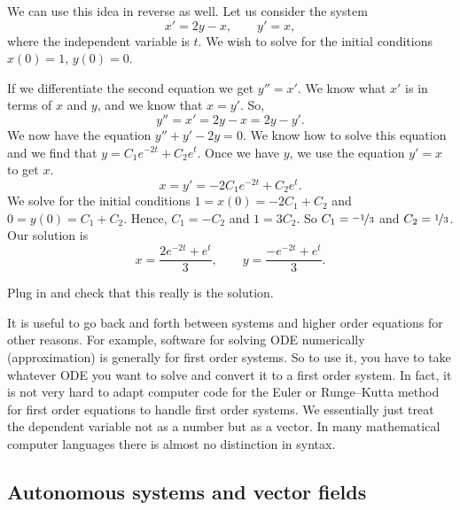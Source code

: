 \begin{example}
We can use this idea in reverse as well.  Let us consider 
the system
\begin{equation*}
x' = 2y-x , \qquad
y' = x, 
\end{equation*}
where the independent variable is $t$.  We wish to solve for the initial
conditions $x(0) = 1$, $y(0) =0$.

If we differentiate the second equation we get
$y''=x'$.  We know what $x'$ is in terms of $x$ and $y$, and
we know that $x=y'$.  So,
\begin{equation*}
y'' = x' = 2y-x = 2y-y' .
\end{equation*}
We now have the equation $y''+y'-2y = 0$.  We know how to solve this
equation and we find that $y = C_1 e^{-2t} + C_2 e^t$.  Once we have $y$,
we use the equation $y' = x$ to get $x$.
\begin{equation*}
x = y' = -2 C_1 e^{-2t} + C_2 e^t .
\end{equation*}
We solve for the initial conditions $1 = x(0) = -2 C_1 + C_2$
and $0 = y(0) = C_1 + C_2$.  Hence, $C_1 = -C_2$ and $1 = 3C_2$.
So $C_1 = \nicefrac{-1}{3}$ and $C_2 = \nicefrac{1}{3}$.  Our solution is
\begin{equation*}
x = \frac{2e^{-2t} + e^t}{3} ,\qquad
y = \frac{-e^{-2t} + e^t}{3} .
\end{equation*}
\end{example}

\begin{exercise}
Plug in and check that this really is the solution.
\end{exercise}

It is useful to go back and forth between systems and higher order equations
for other reasons.  For example, software for solving ODE numerically
(approximation) is generally for first order systems.  So to use it,
you have to take whatever ODE you want to solve and convert it to a first
order system.  In fact, it is not very hard
to adapt computer code for the Euler or Runge--Kutta method for first order equations to
handle first
order systems.  We essentially just treat the dependent variable not as
a number but as a vector.  In many mathematical computer languages there is
almost no distinction in syntax.


\subsection{Autonomous systems and vector fields}

